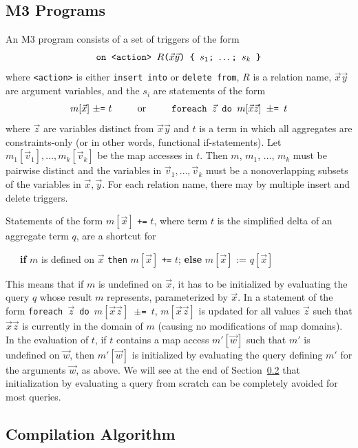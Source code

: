 \subsection{M3 Programs}


An M3 program consists of a set of triggers of the form
\[
\mbox{{\tt on <action> $R$($\vec{x}\vec{y}$) \{ $s_1$; $\dots$; $s_k$ \}}}
\]
where {\tt <action>} is either {\tt insert into} or {\tt delete from},
$R$ is a relation name, $\vec{x}\vec{y}$ are argument variables,
and the $s_i$ are statements of the form
\[
\mbox{$m[\vec{x}]$ $\pm${\tt =} $t$ ~~~~~~ or ~~~~~~
{\tt foreach $\vec{z}$ do $m[\vec{x}\vec{z}]$ $\pm$= $t$}}
\]
where $\vec{z}$ are variables distinct from $\vec{x}\vec{y}$ and
$t$ is a term in which all aggregates are constraints-only (or in other
words, functional if-statements).
Let $m_1[\vec{v}_1], \dots, m_k[\vec{v}_k]$ be the map accesses in $t$.
Then $m$, $m_1$, $\dots$, $m_k$ must be pairwise distinct
and the variables in $\vec{v}_1, \dots, \vec{v}_k$ must be a nonoverlapping
subsets of the variables in $\vec{x}, \vec{y}$.
%
For each relation name, there may by multiple insert and delete triggers.


Statements of the form $m[\vec{x}]$ {\tt +=} $t$,
where term $t$ is the simplified delta
of an aggregate term $q$, are a shortcut for
\begin{tabbing}
~~~{\bf if} $m$ is defined on $\vec{x}$ {\tt then} $m[\vec{x}]$ {\tt +=} $t$;
{\bf else} $m[\vec{x}]$ := $q[\vec{x}]$
\end{tabbing}
This means that if $m$ is undefined on $\vec{x}$, it has to be initialized
by evaluating the query $q$ whose result $m$ represents, parameterized by
$\vec{x}$.
%
In a statement of the form
{\tt foreach $\vec{z}$ do $m[\vec{x}\vec{z}]$ $\pm$= $t$},
$m[\vec{x}\vec{z}]$ is updated for all
values $\vec{z}$ such that $\vec{x}\vec{z}$ is currently in the
domain of $m$ (causing no modifications of map domains).
In the evaluation of $t$, if $t$ contains a map access $m'[\vec{w}]$
such that $m'$ is undefined on $\vec{w}$, then $m'[\vec{w}]$ is initialized
by evaluating the query defining $m'$ for the arguments $\vec{w}$, as
above. We will see at the end of Section~\ref{sec:compilation-alg} that
initialization by evaluating a query from scratch can be completely avoided
for most queries.


\subsection{Compilation Algorithm}
\label{sec:compilation-alg}


